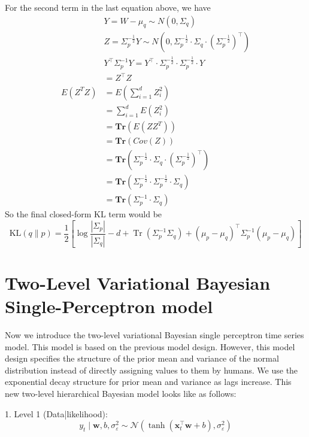 \documentclass{article}
\begin{document}
For the second term in the last equation above, we have 
$$\begin{aligned}
& Y=W-\mu_q \sim N\left(0, \Sigma_q\right) \\
& Z=\Sigma_p^{-\frac{1}{2}} Y \sim N\left(0, \Sigma_p^{-\frac{1}{2}} \cdot \Sigma_q \cdot\left(\Sigma_p^{-\frac{1}{2}}\right)^{\top}\right) \\
& Y^{\top} \Sigma_p^{-1} Y=Y^{\top} \cdot \Sigma_p^{-\frac{1}{2}} \cdot \Sigma_p^{-\frac{1}{2}} \cdot Y \\
& =Z^{\top} Z \\
E(Z^TZ)&= E\left(\sum_{i=1}^d Z_i^2\right)\\
&= \sum_{i=1}^d E(Z_i^2)\\
&= \mathbf{Tr}(E(ZZ^T))\\
&= \mathbf{Tr}(Cov(Z))\\
&= \mathbf{Tr}\left(\Sigma_p^{-\frac{1}{2}} \cdot \Sigma_q \cdot\left(\Sigma_p^{-\frac{1}{2}}\right)^{\top}\right)\\
&= \mathbf{Tr}\left(\Sigma_p^{-\frac{1}{2}}\cdot\Sigma_p^{-\frac{1}{2}}\cdot\Sigma_q\right)\\
&= \mathbf{Tr}\left(\Sigma_p^{-1}\cdot\Sigma_q\right)
\end{aligned}$$
So the final closed-form KL term would be 
$$\mathrm{KL}(q \| p)=\frac{1}{2}\left[\log \frac{\left|\Sigma_p\right|}{\left|\Sigma_q\right|}-d+\operatorname{Tr}\left(\Sigma_p^{-1} \Sigma_q\right)+\left(\mu_p-\mu_q\right)^{\top} \Sigma_p^{-1}\left(\mu_p-\mu_q\right)\right]$$

\section{Two-Level Variational Bayesian Single-Perceptron model}

Now we introduce the two-level variational Bayesian single perceptron time series model. This model is based on the previous model design. However, this model design specifies the structure of the prior mean and variance of the normal distribution instead of directly assigning values to them by humans. We use the exponential decay structure for prior mean and variance as lags increase. This new two-level hierarchical Bayesian model looks like as follows:

1. Level 1 (Data|likelihood):
$$y_t \mid \mathbf{w}, b, \sigma_{\varepsilon}^2 \sim \mathcal{N}\left(\tanh \left(\mathbf{x}_t^{\top} \mathbf{w}+b\right), \sigma_{\varepsilon}^2\right)$$
\end{document}
